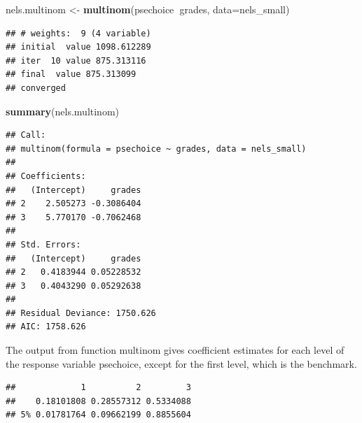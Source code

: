 \documentclass[]{book}
\newenvironment{Shaded}{\begin{snugshade}}{\end{snugshade}}
\newcommand{\DataTypeTok}[1]{\textcolor[rgb]{0.13,0.29,0.53}{#1}}
\newcommand{\FloatTok}[1]{\textcolor[rgb]{0.00,0.00,0.81}{#1}}
\newcommand{\KeywordTok}[1]{\textcolor[rgb]{0.13,0.29,0.53}{\textbf{#1}}}
\newcommand{\NormalTok}[1]{#1}
\newcommand{\OperatorTok}[1]{\textcolor[rgb]{0.81,0.36,0.00}{\textbf{#1}}}
\newcommand{\StringTok}[1]{\textcolor[rgb]{0.31,0.60,0.02}{#1}}
\begin{document}
\begin{Shaded}
\begin{Highlighting}[]
\NormalTok{nels.multinom <-}\StringTok{ }\KeywordTok{multinom}\NormalTok{(psechoice}\OperatorTok{~}\NormalTok{grades, }\DataTypeTok{data=}\NormalTok{nels_small)}
\end{Highlighting}
\end{Shaded}

\begin{verbatim}
## # weights:  9 (4 variable)
## initial  value 1098.612289 
## iter  10 value 875.313116
## final  value 875.313099 
## converged
\end{verbatim}

\begin{Shaded}
\begin{Highlighting}[]
\KeywordTok{summary}\NormalTok{(nels.multinom)}
\end{Highlighting}
\end{Shaded}

\begin{verbatim}
## Call:
## multinom(formula = psechoice ~ grades, data = nels_small)
## 
## Coefficients:
##   (Intercept)     grades
## 2    2.505273 -0.3086404
## 3    5.770170 -0.7062468
## 
## Std. Errors:
##   (Intercept)     grades
## 2   0.4183944 0.05228532
## 3   0.4043290 0.05292638
## 
## Residual Deviance: 1750.626 
## AIC: 1758.626
\end{verbatim}

The output from function multinom gives coefficient estimates for each
level of the response variable psechoice, except for the first level,
which is the benchmark.

\begin{Shaded}
\end{Shaded}

\begin{verbatim}
##             1          2         3
##    0.18101808 0.28557312 0.5334088
## 5% 0.01781764 0.09662199 0.8855604
\end{verbatim}
\end{document}
